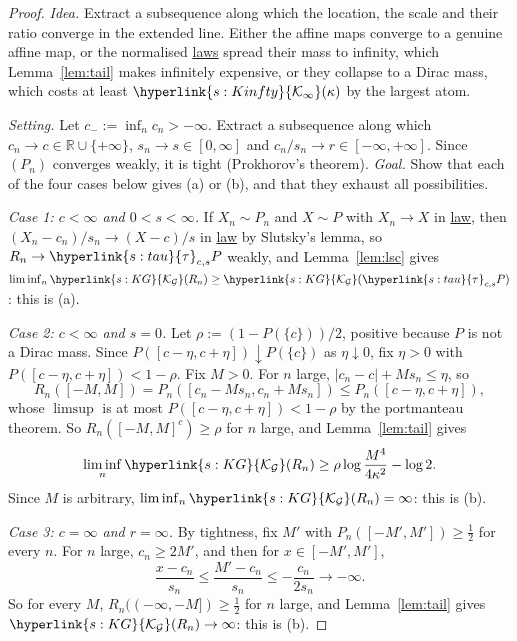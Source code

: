\documentclass[11pt]{article}
\newcommand{\R}{\mathbb{R}}
\newcommand{\sy}[2]{{\hyperlink{#1}{#2}}}
\newcommand{\term}[2]{\hyperlink{#1}{#2}}
\newcommand{\KG}{\sy{s:KG}{\mathcal{K}_{\mathcal{G}}}}
\newcommand{\tauc}{\sy{s:tau}{\tau}}
\newcommand{\Kinfty}{\sy{s:Kinfty}{\mathcal{K}_{\infty}}}
\begin{document}
\begin{proof}
\emph{Idea.} Extract a subsequence along which the location, the scale and their ratio converge in the
extended line. Either the affine maps converge to a genuine affine map, or the normalised \term{w:law}{laws} spread
their mass to infinity, which Lemma~\ref{lem:tail} makes infinitely expensive, or they collapse to a Dirac mass,
which costs at least $\Kinfty(\kappa)$ by the largest atom.

\emph{Setting.} Let $c_-:=\inf_nc_n>-\infty$. Extract a subsequence along which $c_n\to c\in\R\cup\{+\infty\}$,
$s_n\to s\in[0,\infty]$ and $c_n/s_n\to r\in[-\infty,+\infty]$. Since $(P_n)$ converges weakly, it is tight (Prokhorov's
theorem). \emph{Goal.} Show that each of the four cases below gives (a) or (b), and that they exhaust all
possibilities.

\emph{Case 1: $c<\infty$ and $0<s<\infty$.} If $X_n\sim P_n$ and $X\sim P$ with $X_n\to X$ in \term{w:law}{law}, then
$(X_n-c_n)/s_n\to(X-c)/s$ in \term{w:law}{law} by Slutsky's lemma, so $R_n\to\tauc_{c,s}P$ weakly, and Lemma~\ref{lem:lsc} gives
$\liminf_n\KG(R_n)\ge\KG(\tauc_{c,s}P)$: this is (a).

\emph{Case 2: $c<\infty$ and $s=0$.} Let $\rho:=(1-P(\{c\}))/2$, positive because $P$ is not a Dirac mass. Since
$P([c-\eta,c+\eta])\downarrow P(\{c\})$ as $\eta\downarrow0$, fix $\eta>0$ with $P([c-\eta,c+\eta])<1-\rho$. Fix $M>0$. For $n$ large,
$|c_n-c|+Ms_n\le\eta$, so
\begin{equation*}
  R_n([-M,M])=P_n([c_n-Ms_n,c_n+Ms_n])\le P_n([c-\eta,c+\eta]),
\end{equation*}
whose $\limsup$ is at most $P([c-\eta,c+\eta])<1-\rho$ by the portmanteau theorem. So $R_n([-M,M]^c)\ge\rho$ for $n$
large, and Lemma~\ref{lem:tail} gives
\begin{equation*}
  \liminf_n\KG(R_n)\ge\rho\log\frac{M^4}{4\kappa^2}-\log2 .
\end{equation*}
Since $M$ is arbitrary, $\liminf_n\KG(R_n)=\infty$: this is (b).

\emph{Case 3: $c=\infty$ and $r=\infty$.} By tightness, fix $M'$ with $P_n([-M',M'])\ge\frac12$ for every $n$. For $n$ large,
$c_n\ge2M'$, and then for $x\in[-M',M']$,
\begin{equation*}
  \frac{x-c_n}{s_n}\le\frac{M'-c_n}{s_n}\le-\frac{c_n}{2s_n}\longrightarrow-\infty .
\end{equation*}
So for every $M$, $R_n((-\infty,-M])\ge\frac12$ for $n$ large, and Lemma~\ref{lem:tail} gives $\KG(R_n)\to\infty$: this is (b).


\end{proof}
\end{document}
